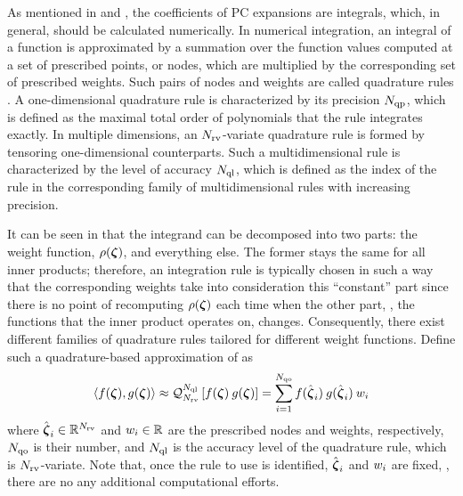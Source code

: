 As mentioned in  and , the coefficients of PC expansions are integrals, which, in general, should be calculated numerically. In numerical integration, an integral of a function is approximated by a summation over the function values computed at a set of prescribed points, or nodes, which are multiplied by the corresponding set of prescribed weights. Such pairs of nodes and weights are called quadrature rules \cite{press2007}. A one-dimensional quadrature rule is characterized by its precision $N_\text{qp}$, which is defined as the maximal total order of polynomials that the rule integrates exactly. In multiple dimensions, an ${N_\text{rv}}$-variate quadrature rule is formed by tensoring one-dimensional counterparts. Such a multidimensional rule is characterized by the level of accuracy $N_\text{ql}$, which is defined as the index of the rule in the corresponding family of multidimensional rules with increasing precision.

It can be seen in  that the integrand can be decomposed into two parts: the weight function, $\rho(\boldsymbol{\zeta})$, and everything else. The former stays the same for all inner products; therefore, an integration rule is typically chosen in such a way that the corresponding weights take into consideration this ``constant'' part since there is no point of recomputing $\rho(\boldsymbol{\zeta})$ each time when the other part, \ie, the functions that the inner product operates on, changes. Consequently, there exist different families of quadrature rules tailored for different weight functions. Define such a quadrature-based approximation of  as
\[
  \oInner{f(\vz)}{g(\vz)} \approx \oQuad{\vars}{\qdlevel}{f(\vz) \: g(\vz)} = \sum_{i = 1}^{\qdorder} f(\qdn{\vz}_i) \: g(\qdn{\vz}_i) \: \qdw_i
\]
where $\hat{\boldsymbol{\zeta}}_i \in \mathbb{R}^{N_\text{rv}}$ and $w_i \in \mathbb{R}$ are the prescribed nodes and weights, respectively, $N_\text{qo}$ is their number, and $N_\text{ql}$ is the accuracy level of the quadrature rule, which is ${N_\text{rv}}$-variate. Note that, once the rule to use is identified, $\hat{\boldsymbol{\zeta}}_i$ and $w_i$ are fixed, \ie, there are no any additional computational efforts.

